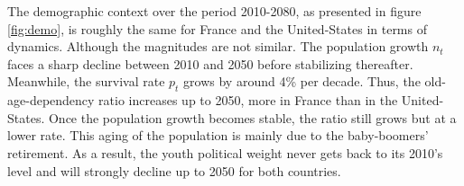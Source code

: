 The demographic context over the period 2010-2080, as presented in figure \ref{fig:demo}, is roughly the same for France and the United-States in terms of dynamics. Although the magnitudes are not similar. The population growth $n_t$ faces a sharp decline between 2010 and 2050 before stabilizing thereafter. Meanwhile, the survival rate $p_t$ grows by around 4\% per decade. Thus, the old-age-dependency ratio increases up to 2050, more in France than in the United-States. Once the population growth becomes stable, the ratio still grows but at a lower rate. This aging of the population is mainly due to the baby-boomers' retirement. As a result, the youth political weight never gets back to its 2010's level and will strongly decline up to 2050 for both countries.


